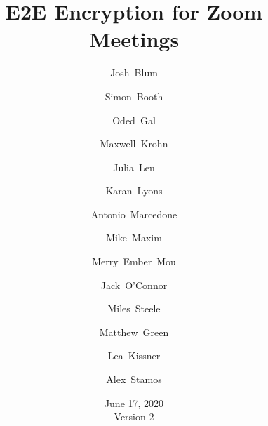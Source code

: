 \documentclass[11pt]{article}
\title{E2E Encryption for Zoom Meetings}
\author[1]{\small Josh~Blum}
\author[1]{\small Simon~Booth}
\author[1]{\small Oded~Gal}
\author[1]{\small Maxwell~Krohn}
\author[1]{\small Julia~Len}
\author[1]{\small Karan~Lyons}
\author[1]{\small Antonio~Marcedone}
\author[1]{\small Mike~Maxim}
\author[1]{\small Merry~Ember~Mou}
\author[1]{\small Jack~O'Connor}
\author[1]{\small Miles~Steele}
\author[2]{\small Matthew~Green}
\author[  \hspace{-1ex}]{\small Lea~Kissner}
\author[3]{\small Alex~Stamos}
\affil[1]{\footnotesize Zoom~Video~Communications}
\affil[2]{\footnotesize Johns~Hopkins~University}
\affil[3]{\footnotesize Stanford~University}
\date{June 17, 2020 \\ \small Version 2}
\begin{document}
    \maketitle
    \thispagestyle{fancy}
    \renewcommand{\thesection}{\arabic{section}} 
    \renewcommand{\thesubsection}{\thesection.\arabic{subsection}}
    
    \newpage
    
    
    
    
    
    
    
    \pagebreak
    
\end{document}
